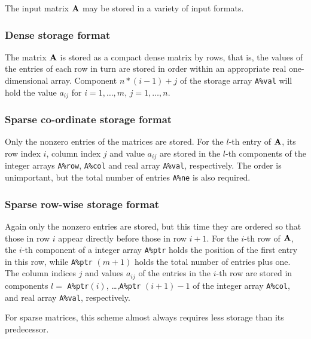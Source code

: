 \documentclass{galahad}
\newcommand{\packagename}{BSC}
\newcommand{\fullpackagename}{\libraryname\_\packagename}
\begin{document}
\galmatrix
The input matrix ${\mathbf{A}}$ may be stored in a variety of input formats.

\subsubsection{Dense storage format}\label{dense}
The matrix ${\mathbf{A}}$ is stored as a compact 
dense matrix by rows, that is, the values of the entries of each row in turn are
stored in order within an appropriate real one-dimensional array.
Component $n \ast (i-1) + j$ of the storage array {\tt A\%val} will hold the 
value $a_{ij}$ for $i = 1, \ldots , m$, $j = 1, \ldots , n$.

\subsubsection{Sparse co-ordinate storage format}\label{coordinate}
Only the nonzero entries of the matrices are stored. For the 
$l$-th entry of ${\mathbf{A}}$, its row index $i$, column index $j$ 
and value $a_{ij}$
are stored in the $l$-th components of the integer arrays {\tt A\%row}, 
{\tt A\%col} and real array {\tt A\%val}, respectively.
The order is unimportant, but the total
number of entries {\tt A\%ne} is also required. 

\subsubsection{Sparse row-wise storage format}\label{rowwise}
Again only the nonzero entries are stored, but this time
they are ordered so that those in row $i$ appear directly before those
in row $i+1$. For the $i$-th row of ${\mathbf{A}}$, the $i$-th component of a 
integer array {\tt A\%ptr} holds the position of the first entry in this row,
while {\tt A\%ptr} $(m+1)$ holds the total number of entries plus one.
The column indices $j$ and values $a_{ij}$ of the entries in the $i$-th row 
are stored in components 
$l =$ {\tt A\%ptr}$(i)$, \ldots ,{\tt A\%ptr} $(i+1)-1$ of the 
integer array {\tt A\%col}, and real array {\tt A\%val}, respectively. 

For sparse matrices, this scheme almost always requires less storage than 
its predecessor.


\end{document}
